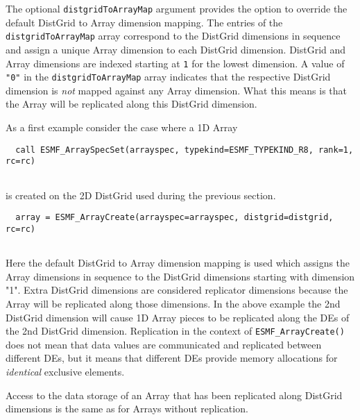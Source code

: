    The optional {\tt distgridToArrayMap} argument provides the option to override
   the default DistGrid to Array dimension mapping. The entries of the
   {\tt distgridToArrayMap} array correspond to the DistGrid dimensions in
   sequence and assign a unique Array dimension to each DistGrid dimension.
   DistGrid and Array dimensions are indexed starting at {\tt 1} for the lowest
   dimension. A value of {\tt "0"} in the {\tt distgridToArrayMap} array 
   indicates that the respective DistGrid dimension is {\em not} mapped against
   any Array dimension. What this means is that the Array will be replicated 
   along this DistGrid dimension.
   
   As a first example consider the case where a 1D Array 

 \begin{verbatim}
  call ESMF_ArraySpecSet(arrayspec, typekind=ESMF_TYPEKIND_R8, rank=1, rc=rc)
 
\end{verbatim}
 

   is created on the 2D DistGrid used during the previous section. 

 \begin{verbatim}
  array = ESMF_ArrayCreate(arrayspec=arrayspec, distgrid=distgrid, rc=rc)
 
\end{verbatim}
 

   Here the default DistGrid to Array dimension mapping is used which assigns
   the Array dimensions in sequence to the DistGrid dimensions starting with
   dimension "1". Extra DistGrid dimensions are considered replicator dimensions
   because the Array will be replicated along those dimensions. In the above
   example the 2nd DistGrid dimension will cause 1D Array pieces to be
   replicated along the DEs of the 2nd DistGrid dimension. Replication in the
   context of {\tt ESMF\_ArrayCreate()} does not mean that data values are
   communicated and replicated between different DEs, but it means that different
   DEs provide memory allocations for {\em identical} exclusive elements.
  
   Access to the data storage of an Array that has been replicated along 
   DistGrid dimensions is the same as for Arrays without replication. 

